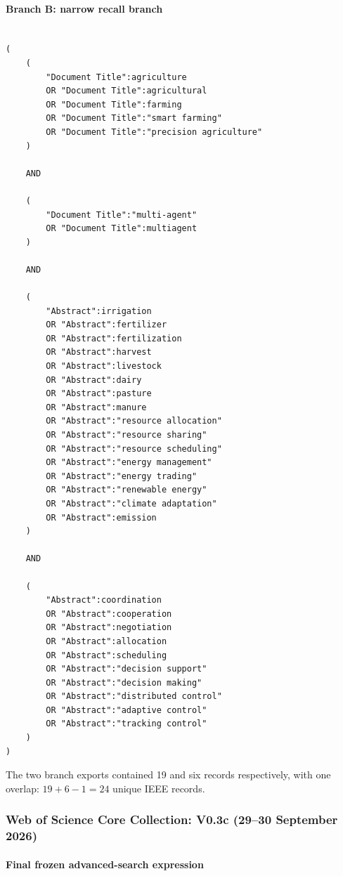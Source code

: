 \paragraph{Branch B: narrow recall branch}

\begin{lstlisting}

(
    (
        "Document Title":agriculture
        OR "Document Title":agricultural
        OR "Document Title":farming
        OR "Document Title":"smart farming"
        OR "Document Title":"precision agriculture"
    )

    AND

    (
        "Document Title":"multi-agent"
        OR "Document Title":multiagent
    )

    AND

    (
        "Abstract":irrigation
        OR "Abstract":fertilizer
        OR "Abstract":fertilization
        OR "Abstract":harvest
        OR "Abstract":livestock
        OR "Abstract":dairy
        OR "Abstract":pasture
        OR "Abstract":manure
        OR "Abstract":"resource allocation"
        OR "Abstract":"resource sharing"
        OR "Abstract":"resource scheduling"
        OR "Abstract":"energy management"
        OR "Abstract":"energy trading"
        OR "Abstract":"renewable energy"
        OR "Abstract":"climate adaptation"
        OR "Abstract":emission
    )

    AND

    (
        "Abstract":coordination
        OR "Abstract":cooperation
        OR "Abstract":negotiation
        OR "Abstract":allocation
        OR "Abstract":scheduling
        OR "Abstract":"decision support"
        OR "Abstract":"decision making"
        OR "Abstract":"distributed control"
        OR "Abstract":"adaptive control"
        OR "Abstract":"tracking control"
    )
)

\end{lstlisting}

\noindent The two branch exports contained 19 and six records respectively, with one overlap: $19+6-1=24$ unique IEEE records.

\subsubsection{Web of Science Core Collection: V0.3c (29--30 September 2026)}

\paragraph{Final frozen advanced-search expression}

